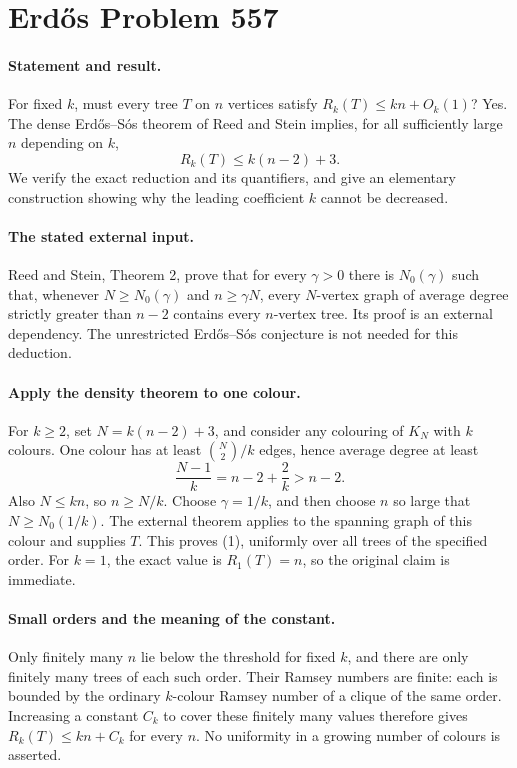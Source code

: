 \section*{Erd\H{o}s Problem 557}

\paragraph{Statement and result.}
For fixed \(k\), must every tree \(T\) on \(n\) vertices satisfy
\(R_k(T)\leq kn+O_k(1)\)? Yes. The dense Erd\H{o}s--S\'os
theorem of Reed and Stein implies, for all sufficiently large
\(n\) depending on \(k\),
\[
 R_k(T)\leq k(n-2)+3. \tag{1}
\]
We verify the exact reduction and its quantifiers, and give an
elementary construction showing why the leading coefficient \(k\)
cannot be decreased.

\paragraph{The stated external input.}
Reed and Stein, Theorem 2, prove that for every \(\gamma>0\)
there is \(N_0(\gamma)\) such that, whenever \(N\geq N_0(\gamma)\)
and \(n\geq\gamma N\), every \(N\)-vertex graph of average degree
strictly greater than \(n-2\) contains every \(n\)-vertex tree.
Its proof is an external dependency. The unrestricted Erd\H{o}s--S\'os
conjecture is not needed for this deduction.

\paragraph{Apply the density theorem to one colour.}
For \(k\geq2\), set \(N=k(n-2)+3\), and consider any colouring
of \(K_N\) with \(k\) colours. One colour has at least
\(\binom N2/k\) edges, hence average degree at least
\[
 \frac{N-1}{k}=n-2+\frac2k>n-2. \tag{2}
\]
Also \(N\leq kn\), so \(n\geq N/k\).
Choose \(\gamma=1/k\), and then choose \(n\) so large that
\(N\geq N_0(1/k)\). The external theorem applies to the spanning
graph of this colour and supplies \(T\). This proves (1), uniformly
over all trees of the specified order.
For \(k=1\), the exact value is \(R_1(T)=n\), so the original
claim is immediate.

\paragraph{Small orders and the meaning of the constant.}
Only finitely many \(n\) lie below the threshold for fixed \(k\),
and there are only finitely many trees of each such order.
Their Ramsey numbers are finite: each is bounded by the ordinary
\(k\)-colour Ramsey number of a clique of the same order.
Increasing a constant \(C_k\) to cover these finitely many values
therefore gives \(R_k(T)\leq kn+C_k\) for every \(n\).
No uniformity in a growing number of colours is asserted.

